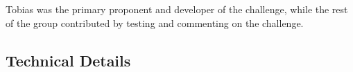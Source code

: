 Tobias was the primary proponent and developer of the challenge, while the rest of the group contributed by testing and commenting on the challenge. 

\subsection{Technical Details}



        

